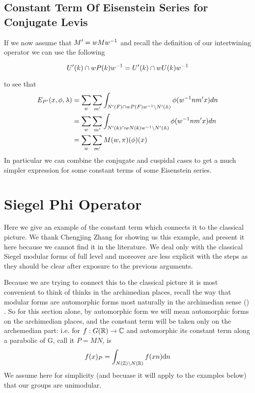     \subsection{Constant Term Of Eisenstein Series for Conjugate Levis}
    If we now assume that \(M' = wMw^{-1}\) and recall the definition of our intertwining operator  we can use the following 
    \begin{Lemma}
        \[U'(k) \cap wP(k) w^{-1} = U'(k) \cap wU(k)w^{-1}\]
    \end{Lemma}
    to see that 
    \[\]
    \begin{equation*}
        \begin{aligned}
             E_{P'}(x, \phi, \lambda) &= \sum_{ w} \sum_{m'} \int_{N'(F)\cap wP(F)w\inv \setminus N'(\A)} \phi( w\inv nm' x)  dn \\
             &=  \sum_{ w} \sum_{m'} \int_{N'(k) \cap wN(k)w\inv \setminus N'(\A)} \phi( w\inv nm' x)  dn \\
             &= \sum_{ w} \sum_{m'} M(w, \pi)(\phi)(x)
        \end{aligned}
    \end{equation*}
    In particular we can combine the conjugate and cuspidal cases to get a much simpler expression for some constant terms of some Eisenstein series. 

    
\section{Siegel Phi Operator}
Here we give an example of the constant term which connects it to the classical picture. We thank Chengjing Zhang for showing us this example, and present it here because we cannot find it in the literature.  We deal only with the classical Siegel modular forms of full level and moreover are less explicit with the steps as they should be clear after exposure to the previous arguments. 

Because we are trying to connect this to the classical picture it is most convenient to think of thinks in the archimedian places, recall the way that modular forms are automorphic forms most naturally in the archimedian sense (\cite[6.2]{getzIntroductionAutomorphicRepresentations2024}) \cite{emertonCLASSICALMODULARFORMS}\cite{bumpAutomorphicFormsRepresentations1997}\cite{booherVIEWINGMODULARFORMS}. So for this section alone, by automorphic form we will mean automorphic forms on the archimedian places, and the constant term will be taken only on the archemedian part: i.e. for \(f: G(\R) \to \C\) and automorphic its constant term along a parabolic of G, call it \(P=MN\), is \cite[8.6]{getzIntroductionAutomorphicRepresentations2024}
\[f(x)_P = \int_{N(\Z)\backslash N(\R)}f(xn) \mathrm{d}n\]
We assume here for simplicity (and becuase it will apply to the examples below) that our groups are unimodular.


